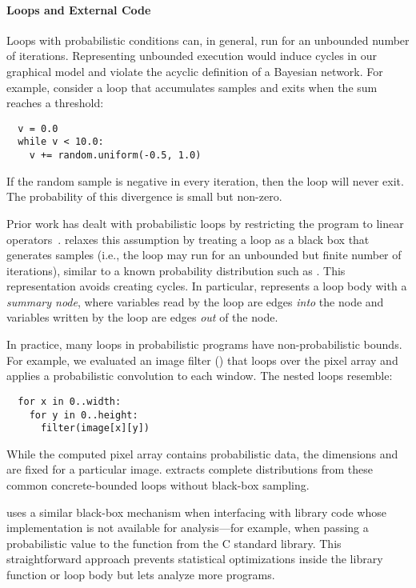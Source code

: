 \label{passert:sec:loops}


\paragraph{Loops and External Code}
Loops with probabilistic conditions can, in general, run for an
unbounded number of iterations. Representing unbounded execution would
induce cycles in our graphical
model and violate the acyclic definition of a Bayesian network. For
example, consider a loop that accumulates samples and exits when the
sum reaches a threshold:
%
\begin{lstlisting}
  v = 0.0
  while v < 10.0:
    v += random.uniform(-0.5, 1.0)
\end{lstlisting}
%
If the random sample is negative in every iteration, then the
loop will never exit. The probability of this divergence is small but non-zero.

Prior work has dealt with probabilistic loops by restricting the program
to linear operators~\cite{sriram-pldi}. \tool relaxes this
assumption by treating a loop as a
black box that generates samples (i.e., the loop may run for an
unbounded but finite number of iterations), similar to a known
probability distribution such as .
This representation avoids creating cycles.
In particular, \tool represents a loop body with a
\emph{summary node}, where variables read by the loop are
edges \emph{into} the node and variables written by the loop are edges \emph{out} of the node.

In practice, many loops in probabilistic programs have
non-probabilistic bounds. For example, we evaluated an image filter
() that loops over the pixel array and applies a probabilistic
convolution to each window. The nested loops resemble:
%
\begin{lstlisting}
  for x in 0..width:
    for y in 0..height:
      filter(image[x][y])
\end{lstlisting}
%
While the computed pixel array contains probabilistic data, the dimensions
 and  are fixed
for a particular image. \tool extracts complete distributions from these common
concrete-bounded loops without black-box sampling.

\tool uses a similar black-box mechanism when interfacing with library code whose
implementation is not available for analysis---for example, when passing a
probabilistic value to the  function from the C standard library.
This straightforward approach prevents statistical optimizations inside the
library function or loop body but lets \tool analyze more programs.


